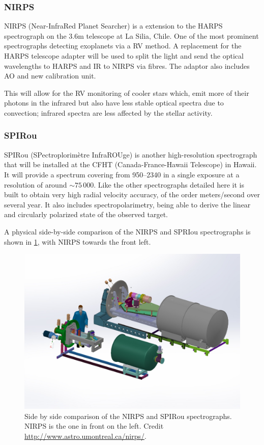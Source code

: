 \subsubsection{NIRPS}
\label{subsec:nirps}
{NIRPS} (Near-InfraRed Planet Searcher) is a \nir{} extension to the HARPS spectrograph on the 3.6\si{\metre} telescope at La Silia, Chile.
One of the most prominent spectrographs detecting exoplanets via a RV method.
A replacement for the HARPS telescope adapter will be used to split the light and send the optical wavelengths to HARPS and IR to NIRPS via fibres.
The adaptor also includes AO and new calibration unit.

This will allow for the RV monitoring of cooler stars which, emit more of their photons in the infrared but also have less stable optical spectra due to convection; infrared spectra are less affected by the stellar activity.

\subsubsection{SPIRou}
\label{subsec:spirou}
{SPIRou} (SPectroplorim\`etre InfraROUge) is another high-resolution \nir{} spectrograph that will be installed at the CFHT (Canada-France-Hawaii Telescope) in Hawaii.
It will provide a spectrum covering from 950--2340\nm{} in a single exposure at a resolution of around \(\sim75\,000\).
Like the other spectrographs detailed here it is built to obtain very high radial velocity accuracy, of the order meters/second over several year.
It also includes spectropolarimetry, being able to derive the linear and circularly polarized state of the observed target.

A physical side-by-side comparison of the {NIRPS} and {SPRIou} spectrographs is shown in \cref{fig:nirps-vs-spirou}, with {NIRPS} towards the front left.
\begin{figure}
    \centering
    \includegraphics[width=0.7\linewidth]{figures/spectroscopy/NIRPS-vs-SPIROU}
    \caption{Side by side comparison of the {NIRPS} and {SPIRou} spectrographs. {NIRPS} is the one in front on the left.
Credit \href{http://www.astro.umontreal.ca/nirps/}{http://www.astro.umontreal.ca/nirps/}.}
    \label{fig:nirps-vs-spirou}
\end{figure}
